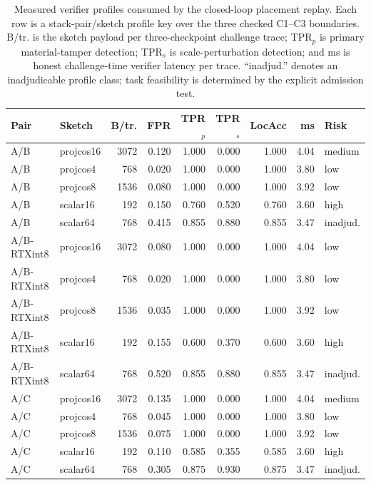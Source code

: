 \documentclass[sigplan,screen,review,anonymous]{acmart}
\begin{document}
\begin{table}[b]
\centering
\scriptsize
\setlength{\tabcolsep}{4.2pt}
\renewcommand{\arraystretch}{0.94}
\caption{Measured verifier profiles consumed by the closed-loop placement
replay. Each row is a stack-pair/sketch profile key over the three checked
C1--C3 boundaries. B/tr. is the sketch payload per three-checkpoint challenge
trace; TPR\(_p\) is primary material-tamper detection; TPR\(_s\) is
scale-perturbation detection; and ms is honest challenge-time verifier latency
per trace. ``inadjud.'' denotes an inadjudicable profile class; task feasibility
is determined by the explicit admission test.}
\label{tab:app-profile-matrix}
\begin{tabular}{llrrrrrrl}
\toprule
Pair & Sketch & B/tr. & FPR & TPR\(_p\) & TPR\(_s\) & LocAcc & ms & Risk \\
\midrule
A/B & projcos16 & 3072 & 0.120 & 1.000 & 0.000 & 1.000 & 4.04 & medium \\
A/B & projcos4 & 768 & 0.020 & 1.000 & 0.000 & 1.000 & 3.80 & low \\
A/B & projcos8 & 1536 & 0.080 & 1.000 & 0.000 & 1.000 & 3.92 & low \\
A/B & scalar16 & 192 & 0.150 & 0.760 & 0.520 & 0.760 & 3.60 & high \\
A/B & scalar64 & 768 & 0.415 & 0.855 & 0.880 & 0.855 & 3.47 & inadjud. \\
\addlinespace[0.25em]
A/B-RTXint8 & projcos16 & 3072 & 0.080 & 1.000 & 0.000 & 1.000 & 4.04 & low \\
A/B-RTXint8 & projcos4 & 768 & 0.020 & 1.000 & 0.000 & 1.000 & 3.80 & low \\
A/B-RTXint8 & projcos8 & 1536 & 0.035 & 1.000 & 0.000 & 1.000 & 3.92 & low \\
A/B-RTXint8 & scalar16 & 192 & 0.155 & 0.600 & 0.370 & 0.600 & 3.60 & high \\
A/B-RTXint8 & scalar64 & 768 & 0.520 & 0.855 & 0.880 & 0.855 & 3.47 & inadjud. \\
\addlinespace[0.25em]
A/C & projcos16 & 3072 & 0.135 & 1.000 & 0.000 & 1.000 & 4.04 & medium \\
A/C & projcos4 & 768 & 0.045 & 1.000 & 0.000 & 1.000 & 3.80 & low \\
A/C & projcos8 & 1536 & 0.075 & 1.000 & 0.000 & 1.000 & 3.92 & low \\
A/C & scalar16 & 192 & 0.110 & 0.585 & 0.355 & 0.585 & 3.60 & high \\
A/C & scalar64 & 768 & 0.305 & 0.875 & 0.930 & 0.875 & 3.47 & inadjud. \\

\end{tabular}
\end{table}
\end{document}

